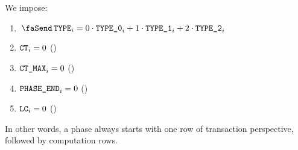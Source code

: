 \begin{center}
\end{center}
We impose:
\begin{enumerate}
	\item $\txType   _{i}   = 0  \cdot \typeZeroTx _{i} + 1 \cdot \typeOneTx _{i} + 2 \cdot \typeTwoTx _{i}$
	\item $\texttt{CT}       _{i}   = 0$ (\sanityCheck)
	\item $\texttt{CT\_MAX}    _{i}   = 0$ (\sanityCheck)
	\item $\texttt{PHASE\_END} _{i}   = 0$ (\sanityCheck)
	\item $\texttt{LC}       _{i}   = 0$ (\sanityCheck)
\end{enumerate}
In other words, a phase always starts with one row of transaction perspective, followed by computation rows.
